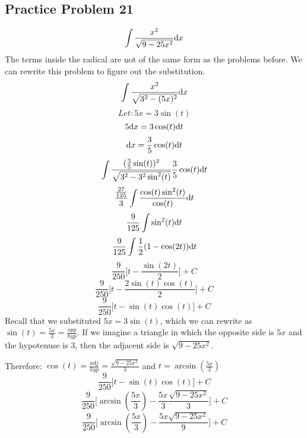 \documentclass{math}
\begin{document}
\subsection*{Practice Problem 21}
\[ \int{\frac{x^{2}}{\sqrt{9-25x^{2}}}\mathrm{d}{x}} \]
The terms inside the radical are not of the same form as the problems
before. We can rewrite this problem to figure out the substitution.
\[ \int{\frac{x^{2}}{\sqrt{3^{2}-(5x)^{2}}}\mathrm{d}{x}} \]
\[ Let: 5x = 3\sin(t) \]
\[ 5\mathrm{d}{x} = 3\cos(t)\mathrm{d}{t} \]
\[ \mathrm{d}{x} = \frac{3}{5}\cos(t)\mathrm{d}{t} \]
\[ \int{\frac{(\frac{3}{5}\sin(t))^{2}}{\sqrt{3^{2}-3^{2}\sin^{2}(t)}}
   \frac{3}{5}\cos(t)\mathrm{d}{t}} \]
\[ \frac{\frac{27}{125}}{3}
   \int{\frac{\cos(t)\sin^{2}(t)}{\cos(t)}\mathrm{d}{t}} \]
\[ \frac{9}{125}\int{\sin^{2}(t)\mathrm{d}{t}} \]
\[ \frac{9}{125}\int{\frac{1}{2}(1-\cos(2t))\mathrm{d}{t}} \]
\[ \frac{9}{250}\bigg[t-\frac{\sin(2t)}{2}\bigg]+C \]
\[ \frac{9}{250}\bigg[t-\frac{2\sin(t)\cos(t)}{2}\bigg]+C \]
\[ \frac{9}{250}\bigg[t-\sin(t)\cos(t)\bigg]+C \]
Recall that we substituted \( 5x = 3\sin(t) \), which we can rewrite as
\( \sin(t) = \frac{5x}{3} = \frac{opp}{hyp} \). If we imagine a triangle
in which the opposite side is \( 5x \) and the hypotenuse is 3, then the
adjacent side is \( \sqrt{9-25x^{2}} \).
\begin{center}
\end{center}
Therefore: \( \cos(t) = \frac{adj}{hyp} = \frac{\sqrt{9-25x^{2}}}{3} \)
and \( t = \arcsin(\frac{5x}{3}) \)
\[ \frac{9}{250}\bigg[t-\sin(t)\cos(t)\bigg]+C \]
\[ \frac{9}{250}\bigg[\arcsin(\frac{5x}{3})-
   \frac{5x}{3}\frac{\sqrt{9-25x^{2}}}{3}\bigg]+C \]
\[ \frac{9}{250}\bigg[\arcsin(\frac{5x}{3})-
   \frac{5x\sqrt{9-25x^{2}}}{9}\bigg]+C \]
\end{document}
